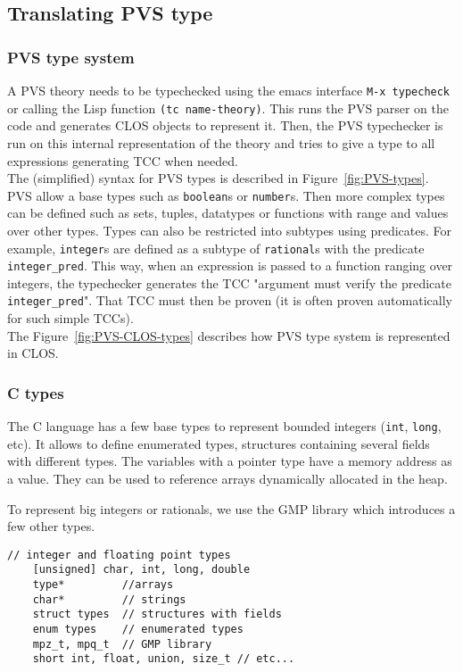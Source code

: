 \documentclass[12pt,a4paper]{article}
\newcommand{\cl}[1]{\texttt{#1}}
\begin{document}
\subsection{Translating PVS type}
\label{subsec:pvstypes}

\subsubsection{PVS type system}
A PVS theory needs to be typechecked using the emacs interface \cl{M-x typecheck} or calling the Lisp function \cl{(tc name-theory)}. This runs the PVS parser on the code and generates CLOS objects to represent it. Then, the PVS typechecker is run on this internal representation of the theory and tries to give a type to all expressions generating TCC when needed.\\

The (simplified) syntax for PVS types is described in Figure~\ref{fig:PVS-types}. PVS allow a base types such as \cl{boolean}s or \cl{number}s. Then more complex types can be defined such as sets, tuples, datatypes or functions with range and values over other types. Types can also be restricted into subtypes using predicates. For example, \cl{integer}s are defined as a subtype of \cl{rational}s with the predicate \cl{integer\_pred}. This way, when an expression is passed to a function ranging over integers, the typechecker generates the TCC "argument must verify the predicate \cl{integer\_pred}". That TCC must then be proven (it is often proven automatically for such simple TCCs). \\

The Figure~\ref{fig:PVS-CLOS-types} describes how PVS type system is represented in CLOS. 


\subsubsection{C types}
The C language \cite{huss2004c} has a few base types to represent bounded integers (\cl{int}, \cl{long}, etc). It allows to define enumerated types, structures containing several fields with different types. The variables with a pointer type have a memory address as a value. They can be used to reference arrays dynamically allocated in the heap.

To represent big integers or rationals, we use the GMP library which introduces a few other types.

\begin{lstlisting}[caption=A few C types]
    // integer and floating point types
    [unsigned] char, int, long, double
    type*         //arrays
    char*         // strings
    struct types  // structures with fields
    enum types    // enumerated types
    mpz_t, mpq_t  // GMP library
    short int, float, union, size_t // etc...
\end{lstlisting}
\end{document}
